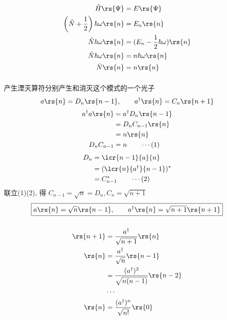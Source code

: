 \begin{frame}
  \解~ \[ 
  \begin{aligned}
      \hat{H}\rs{\Psi} & =E \rs{\Psi}  \\ 
      \left(\hat{N} + \frac{1 }{2}\right) \hbar \omega \rs{n} & =E_n \rs{n}  \\ 
     \hat{N} \hbar \omega \rs{n} & =(E_n-\frac{1}{2} \hbar \omega) \rs{n}  \\ 
     \hat{N} \hbar \omega \rs{n} & = n \hbar \omega \rs{n}  \\ 
     \hat{N}   \rs{n} & = n  \rs{n}  \\ 
  \end{aligned} 
  \]
\end{frame}

\begin{frame}
    \frametitle{}
    产生湮灭算符分别产生和消灭这个模式的一个光子
    \[ {a \rs{n}= D_n\rs{n-1}}, \qquad a^\dagger \rs{n}= C_n \rs{n+1} \]  
    \[ 
      \begin{aligned}
        a^\dagger a \rs{n} &= a^\dagger D_n\rs{n-1} \\ 
        &= D_n C_{n-1} \rs{n}  \\
        &= n \rs{n} \\ 
        D_n C_{n-1}&=n \qquad \cdots (1)
      \end{aligned}
      \] 
      \[ 
        \begin{aligned}
          D_n &=  \lcr{n-1}{a}{n} \\
          &=  (\lcr{n}{a^\dagger }{n-1})^* \\
          &= C_{n-1} ^*   \qquad \cdots (2)
        \end{aligned}
        \] 
        联立(1)(2), 得 $C_{n-1}=\sqrt{n}= D_n, C_{n}=\sqrt{n+1} $\\  
        \[\boxed{ {a \rs{n}= \sqrt{n}\rs{n-1}}, \qquad a^\dagger \rs{n}= \sqrt{n+1} \rs{n+1}} \]   
\end{frame}

\begin{frame}
    \frametitle{}
    \[ 
  \begin{aligned}
      \rs{n+1} &= \frac{a^\dagger }{\sqrt{n+1}} \rs{n} \\
      \rs{n} &= \frac{a^\dagger }{\sqrt{n}} \rs{n-1} \\
             &= \frac{(a^\dagger)^2 }{\sqrt{n(n-1)}} \rs{n-2} \\
             & \cdots \\
      \rs{n} &= \frac{(a^\dagger)^n }{\sqrt{n!}} \rs{0} \\
  \end{aligned}    
    \]
\end{frame}

